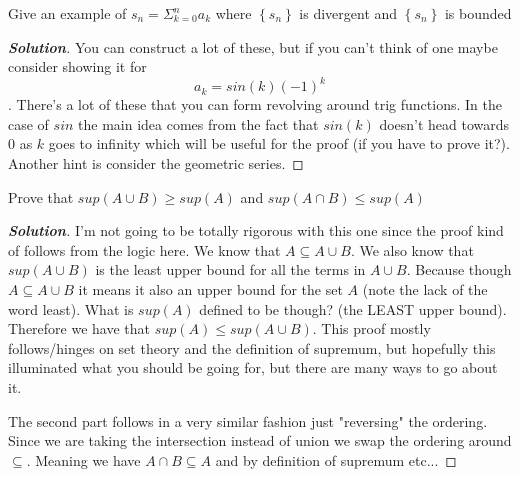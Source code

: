 \documentclass[11pt]{article}
\newenvironment{problem}[2][Problem\!]{\begin{trivlist}
\item[\hskip \labelsep {\bfseries #1}\hskip \labelsep {\bfseries #2}]}{\end{trivlist}}
\newenvironment{solution}{\begin{proof}[\textbf{\textit{Solution}}] }{\end{proof}}
\newcommand{\set}[1]{\left\{#1\right\}} %
\renewcommand{\geq}{\geqslant}
\renewcommand{\leq}{\leqslant}
\begin{document}
\begin{tcolorbox}
     \begin{problem} {12.3}
        Give an example of  $s_n = \Sigma_{k = 0}^{n}a_k$ where $\set{s_n}$ is divergent and $\set{s_n}$ is bounded
     \end{problem}
\end{tcolorbox}

\begin{solution}
  You can construct a lot of these, but if you can't think of one maybe consider showing it for\[a_k = sin(k)(-1)^{k}\]. There's a lot of these that you can form revolving around trig functions. In the case of $sin$ the main idea comes from the fact that $sin(k)$ doesn't head towards 0 as $k$ goes to infinity which will be useful for the proof (if you have to prove it?). Another hint is consider the geometric series. 
\end{solution}


\begin{tcolorbox}
  \begin{problem} {13.1}
    Prove that $sup(A \cup B) \geq sup(A)$ and $sup(A \cap B) \leq sup(A)$
  \end{problem}
\end{tcolorbox}
\begin{solution}
  I'm not going to be totally rigorous with this one since the proof kind of follows from the logic here. We know that $A \subseteq A\cup B$. We also know that $sup(A\cup B)$ is the least upper bound for all the terms in $A\cup B$. Because though $A \subseteq A\cup B$ it means it also an upper bound for the set $A$ (note the lack of  the word least). What is $sup(A)$ defined to be though? (the LEAST upper bound). Therefore we have that $sup(A) \leq sup(A\cup B)$. This proof mostly follows/hinges on set theory and the definition of supremum, but hopefully this illuminated what you should be going for, but there are many ways to go about it. 

  The second part follows in a very similar fashion just "reversing" the ordering. Since we are taking the intersection instead of union we swap the ordering around $\subseteq$. Meaning we have $A\cap B \subseteq A$ and by definition of supremum etc...  
\end{solution}
\end{document}
